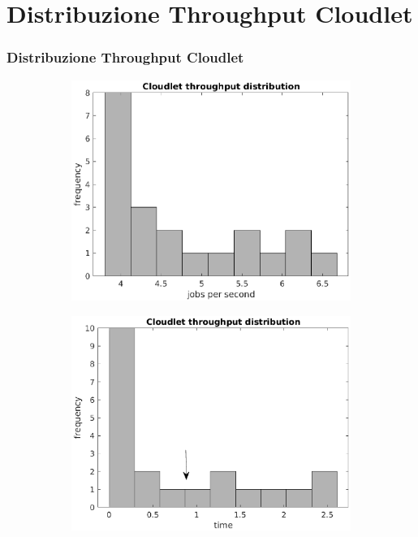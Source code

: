 \section{Distribuzione Throughput Cloudlet}
\begin{frame}
\frametitle{Distribuzione Throughput Cloudlet}
\begin{figure}[!h]
\centering
%
\begin{subfigure}[t]{0.49\textwidth}
\includegraphics[width=\textwidth]{../figures/thrclet_hist}
\label{thrclet_hist}
\end{subfigure}
%
\begin{subfigure}[t]{0.49\textwidth}
\includegraphics[width=\textwidth]{../figures/thrless_hist}

\end{subfigure}
\end{figure}
\end{frame}
